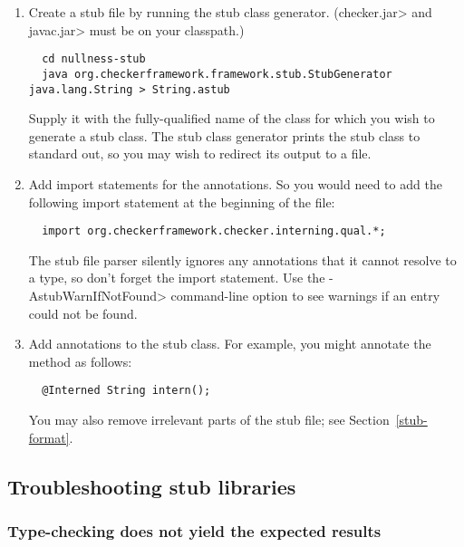 \begin{enumerate}

\item
  Create a stub file by running the stub class generator.  (\<checker.jar> and \<javac.jar>
  must be on your classpath.)

\begin{Verbatim}
  cd nullness-stub
  java org.checkerframework.framework.stub.StubGenerator java.lang.String > String.astub
\end{Verbatim}

  Supply it with the fully-qualified name of the class for which you wish to
  generate a stub class.  The stub class generator prints the
  stub class to standard out, so you may wish to redirect its output to a
  file.

\item
  Add import statements for the annotations.  So you would need to
add the following import statement at the beginning of the file:

\begin{Verbatim}
  import org.checkerframework.checker.interning.qual.*;
\end{Verbatim}

\noindent
The stub file parser silently ignores any annotations that it cannot
resolve to a type, so don't forget the import statement.
Use the \<-AstubWarnIfNotFound> command-line option to see warnings
if an entry could not be found.

\item
  Add annotations to the stub class.  For example, you might annotate
  the  method as follows:

\begin{Verbatim}
  @Interned String intern();
\end{Verbatim}

  You may also remove irrelevant parts of the stub file; see
  Section~\ref{stub-format}.

\end{enumerate}


\subsection{Troubleshooting stub libraries\label{stub-troubleshooting}}


\subsubsection{Type-checking does not yield the expected results\label{stub-troubleshooting-type-checking-results}}

